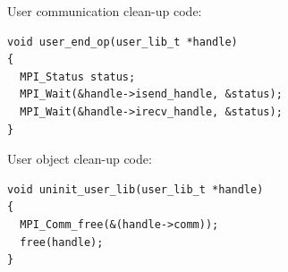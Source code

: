 \begin{example}
\noindent User communication clean-up code:
\begin{lstlisting}[language={[MPI]C}]
void user_end_op(user_lib_t *handle)
{
  MPI_Status status;
  MPI_Wait(&handle->isend_handle, &status);
  MPI_Wait(&handle->irecv_handle, &status);
}
\end{lstlisting}

\noindent User object clean-up code:
\begin{lstlisting}[language={[MPI]C}]
void uninit_user_lib(user_lib_t *handle)
{
  MPI_Comm_free(&(handle->comm));
  free(handle);
}
\end{lstlisting}
\end{example}

